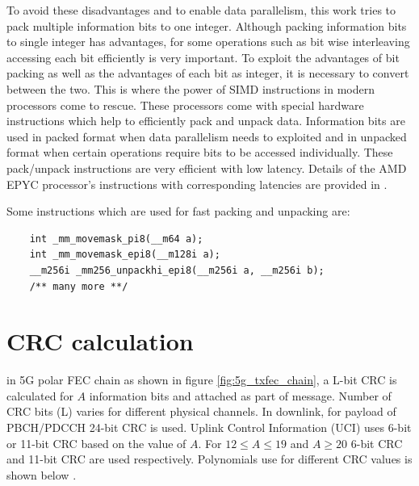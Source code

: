 To avoid these disadvantages and to enable data parallelism, this work tries to pack multiple information bits to one integer. Although packing information bits to single integer has advantages, for some operations such as bit wise interleaving accessing each bit efficiently is very important. To exploit the advantages of bit packing as well as the advantages of each bit as integer, it is necessary to convert between the two. This is where the power of SIMD instructions in modern processors come to rescue. These processors come with special hardware instructions which help to efficiently pack and unpack data. Information bits are used in packed format when data parallelism needs to exploited and in unpacked format when certain operations require bits to be accessed individually. These pack/unpack instructions are very efficient with low latency. Details of the AMD EPYC processor's instructions with corresponding latencies are provided in \cite{AgnerFog}.

Some instructions which are used for fast packing and unpacking are:
\begin{code}
	\label{code:samplepackUnpack}
\begin{verbatim}
	int _mm_movemask_pi8(__m64 a);
	int _mm_movemask_epi8(__m128i a);
	__m256i _mm256_unpackhi_epi8(__m256i a, __m256i b);
	/** many more **/
\end{verbatim}
\end{code}


\section{CRC calculation}
in 5G polar FEC chain as shown in figure \ref{fig:5g_txfec_chain}, a L-bit CRC is calculated for $A$ information bits and attached as part of message. Number of CRC bits (L) varies for different physical channels. In downlink, for payload of PBCH/PDCCH 24-bit CRC is used. Uplink Control Information (UCI) uses 6-bit or 11-bit CRC based on the value of $A$. For $12 \leq A \leq 19$ and $A \geq 20$ 6-bit CRC and 11-bit CRC are used respectively. Polynomials use for different CRC values is shown below \cite{3gpp.38.212}.

